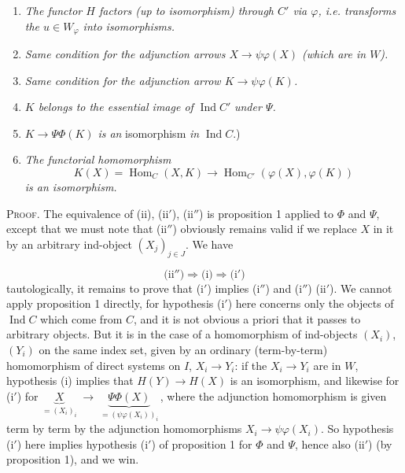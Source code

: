 \documentclass[11pt]{article}
\newcommand{\printedpage}[1]{\marginpar{\footnotesize p.~#1}}
\newcommand{\msp}[1]{\marginpar{\footnotesize [#1]}}
\newcommand{\Hom}{\operatorname{Hom}}
\newcommand{\Ind}{\operatorname{Ind}}
\begin{document}
\begin{enumerate}[label={}]
\item[(i)] \textit{The functor $H$ factors (up to isomorphism) through $C'$ via $\varphi$, i.e. transforms the $u \in W_\varphi$ into isomorphisms.}
\printedpage{27}
\item[(i$'$)] \textit{Same condition for the adjunction arrows $X \longrightarrow \psi\varphi(X)$ (which are in $W$).}
\item[(i$''$)] \textit{Same condition for the adjunction arrow $K \longrightarrow \psi\varphi(K)$.}
\item[(ii)] \textit{$K$ belongs to the essential image of} $\Ind C'$ \textit{under $\Psi$.}
\item[(ii$'$)] $K \longrightarrow \Psi\Phi(K)$ \textit{is an} isomorphism \textit{in} $\Ind C$.) %
\item[(ii$''$)] \textit{The functorial homomorphism}
\[
K(X) = \Hom_C(X,K) \longrightarrow \Hom_{C'}(\varphi(X),\varphi(K))
\]
 \textit{is an isomorphism.}
\end{enumerate}

\textsc{Proof.} The equivalence of (ii), (ii$'$), (ii$''$) is proposition 1 applied to $\Phi$ and $\Psi$, except that we must note that (ii$''$) obviously remains valid if we replace $X$ in it by an arbitrary ind-object $(X_j)_{j\in J}$. We have

\noindent\msp{page 42}%
\[
\text{(ii$''$)} \Longrightarrow \text{(i)} \Longrightarrow \text{(i$'$)}
\]
tautologically, it remains to prove that (i$'$) implies (i$''$) and (i$''$) (ii$'$). We cannot apply proposition 1 directly, for hypothesis (i$'$) here concerns only the objects of $\Ind C$ which come from $C$, and it is not obvious a priori that it passes to arbitrary objects. But it is in the case of a homomorphism of ind-objects $(X_i)$, $(Y_i)$ on the same index set, given by an ordinary (term-by-term) homomorphism of direct systems on $I$, $X_i \longrightarrow Y_i$: if the $X_i \longrightarrow Y_i$ are in $W$, hypothesis (i) implies that $H(Y) \longrightarrow H(X)$ is an isomorphism, and likewise for (i$'$) for $\underbrace{X}_{=(X_i)_i} \;\longrightarrow\; \underbrace{\Psi\Phi(X)}_{=(\psi\varphi(X_i))_i}$\,, where the adjunction homomorphism is given term by term by the adjunction homomorphisms $X_i \longrightarrow \psi\varphi(X_i)$. So hypothesis (i$'$) here implies hypothesis (i$'$) of proposition 1 for $\Phi$ and $\Psi$, hence also (ii$'$) (by proposition 1), and we win. %
\end{document}
